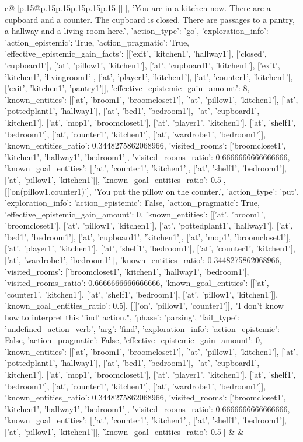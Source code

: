 \documentclass{article}
\begin{document}
{\begin{supertabular}{c@{$\;$}|p{.15\linewidth}@{}p{.15\linewidth}p{.15\linewidth}p{.15\linewidth}p{.15\linewidth}p{.15\linewidth}}
{{{	 [[[], 'You are in a kitchen now. There are a cupboard and a counter. The cupboard is closed. There are passages to a pantry, a hallway and a living room here.', {'action_type': 'go', 'exploration_info': {'action_epistemic': True, 'action_pragmatic': True, 'effective_epistemic_gain_facts': [['exit', 'kitchen1', 'hallway1'], ['closed', 'cupboard1'], ['at', 'pillow1', 'kitchen1'], ['at', 'cupboard1', 'kitchen1'], ['exit', 'kitchen1', 'livingroom1'], ['at', 'player1', 'kitchen1'], ['at', 'counter1', 'kitchen1'], ['exit', 'kitchen1', 'pantry1']], 'effective_epistemic_gain_amount': 8, 'known_entities': [['at', 'broom1', 'broomcloset1'], ['at', 'pillow1', 'kitchen1'], ['at', 'pottedplant1', 'hallway1'], ['at', 'bed1', 'bedroom1'], ['at', 'cupboard1', 'kitchen1'], ['at', 'mop1', 'broomcloset1'], ['at', 'player1', 'kitchen1'], ['at', 'shelf1', 'bedroom1'], ['at', 'counter1', 'kitchen1'], ['at', 'wardrobe1', 'bedroom1']], 'known_entities_ratio': 0.3448275862068966, 'visited_rooms': ['broomcloset1', 'kitchen1', 'hallway1', 'bedroom1'], 'visited_rooms_ratio': 0.6666666666666666, 'known_goal_entities': [['at', 'counter1', 'kitchen1'], ['at', 'shelf1', 'bedroom1'], ['at', 'pillow1', 'kitchen1']], 'known_goal_entities_ratio': 0.5}}], [['on(pillow1,counter1)'], 'You put the pillow on the counter.', {'action_type': 'put', 'exploration_info': {'action_epistemic': False, 'action_pragmatic': True, 'effective_epistemic_gain_amount': 0, 'known_entities': [['at', 'broom1', 'broomcloset1'], ['at', 'pillow1', 'kitchen1'], ['at', 'pottedplant1', 'hallway1'], ['at', 'bed1', 'bedroom1'], ['at', 'cupboard1', 'kitchen1'], ['at', 'mop1', 'broomcloset1'], ['at', 'player1', 'kitchen1'], ['at', 'shelf1', 'bedroom1'], ['at', 'counter1', 'kitchen1'], ['at', 'wardrobe1', 'bedroom1']], 'known_entities_ratio': 0.3448275862068966, 'visited_rooms': ['broomcloset1', 'kitchen1', 'hallway1', 'bedroom1'], 'visited_rooms_ratio': 0.6666666666666666, 'known_goal_entities': [['at', 'counter1', 'kitchen1'], ['at', 'shelf1', 'bedroom1'], ['at', 'pillow1', 'kitchen1']], 'known_goal_entities_ratio': 0.5}}], [[['on', 'pillow1', 'counter1']], "I don't know how to interpret this 'find' action.", {'phase': 'parsing', 'fail_type': 'undefined_action_verb', 'arg': 'find', 'exploration_info': {'action_epistemic': False, 'action_pragmatic': False, 'effective_epistemic_gain_amount': 0, 'known_entities': [['at', 'broom1', 'broomcloset1'], ['at', 'pillow1', 'kitchen1'], ['at', 'pottedplant1', 'hallway1'], ['at', 'bed1', 'bedroom1'], ['at', 'cupboard1', 'kitchen1'], ['at', 'mop1', 'broomcloset1'], ['at', 'player1', 'kitchen1'], ['at', 'shelf1', 'bedroom1'], ['at', 'counter1', 'kitchen1'], ['at', 'wardrobe1', 'bedroom1']], 'known_entities_ratio': 0.3448275862068966, 'visited_rooms': ['broomcloset1', 'kitchen1', 'hallway1', 'bedroom1'], 'visited_rooms_ratio': 0.6666666666666666, 'known_goal_entities': [['at', 'counter1', 'kitchen1'], ['at', 'shelf1', 'bedroom1'], ['at', 'pillow1', 'kitchen1']], 'known_goal_entities_ratio': 0.5}}]] 
	  } 
	   } 
	   } 
	 & & \\ 
 


\end{supertabular}}
\end{document}
